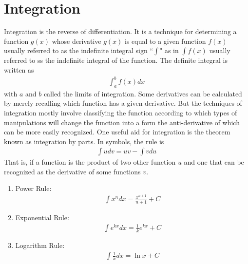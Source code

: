 \documentclass[12pt]{report}
\begin{document}
	\section{Integration}
	Integration is the reverse of differentiation. It is a technique for determining a function $g(x)$ whose derivative $g(x)$ is equal to a given function $f(x)$ usually referred to as the indefinite integral sign ``$\int$" as in $\int f(x)$ usually referred to  ss the indefinite integral of the function. The definite integral is written as 
	\begin{eqnarray*}
		\int_a^b f(x) dx
	\end{eqnarray*}
	with $a$ and $b$ called the limits of integration. Some derivatives can be calculated by merely recalling which function has a given derivative. But the techniques of integration mostly involve classifying the function according to which types of manipulations will change the function into a form the anti-derivative of which can be more easily recognized. One useful aid for integration is the theorem known as integration by parts. In symbols, the rule is 
	\begin{eqnarray*}
		\int u dv = uv - \int v du
	\end{eqnarray*}
	That is, if a function is the product of two other function $u$ and one that can be recognized as the derivative of some functions $v$.
	
	\begin{enumerate}
		\item Power Rule: 
			\begin{eqnarray*}
				\int x^n dx = \frac{x^{n+1}}{n+1} + C
			\end{eqnarray*}
		
		\item Exponential Rule:
			\begin{eqnarray*}
				\int e^{kx}dx = \frac{1}{k}e^{kx}+ C
			\end{eqnarray*}
		
		\item Logarithm Rule:
			\begin{eqnarray*}
				\int\frac{1}{x}dx = \ln x + C
			\end{eqnarray*}
	\end{enumerate}
	
\end{document}
